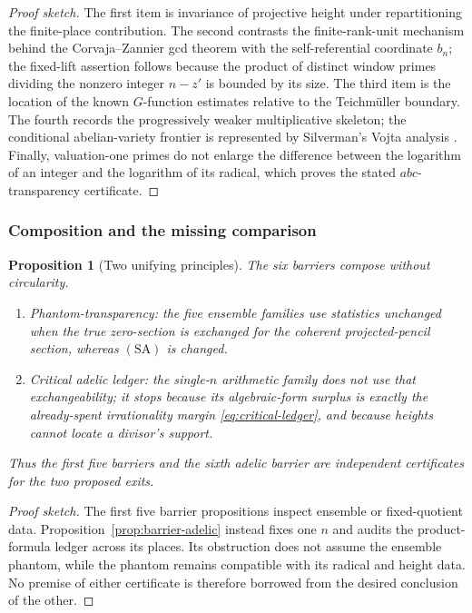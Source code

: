 \documentclass[11pt]{amsart}
\theoremstyle{plain}
\newtheorem{proposition}{Proposition}
\theoremstyle{remark}
\begin{document}
\begin{proof}[Proof sketch]
The first item is invariance of projective height under repartitioning
the finite-place contribution.  The second contrasts the
finite-rank-unit mechanism behind the Corvaja--Zannier gcd theorem
\cite{BugeaudCorvajaZannier2003} with the self-referential coordinate
$b_n$; the fixed-lift assertion follows because the product of distinct
window primes dividing the nonzero integer $n-z'$ is bounded by its
size.  The third item is the location of the known $G$-function
estimates relative to the Teichm\"uller boundary.  The fourth records
the progressively weaker multiplicative skeleton; the conditional
abelian-variety frontier is represented by Silverman's Vojta analysis
\cite{Silverman2005}.  Finally, valuation-one primes do not enlarge the
difference between the logarithm of an integer and the logarithm of
its radical, which proves the stated $abc$-transparency certificate.
\end{proof}

\subsubsection{Composition and the missing comparison}

\begin{proposition}[Two unifying principles]
\label{prop:two-principles}
The six barriers compose without circularity.
\begin{enumerate}
\item \emph{Phantom-transparency:} the five ensemble families use
statistics unchanged when the true zero-section is exchanged for the
coherent projected-pencil section, whereas $(\mathrm{SA})$ is changed.
\item \emph{Critical adelic ledger:} the single-$n$ arithmetic family
does not use that exchangeability; it stops because its
algebraic-form surplus is exactly the already-spent irrationality
margin \eqref{eq:critical-ledger}, and because heights cannot locate a
divisor's support.
\end{enumerate}
Thus the first five barriers and the sixth adelic barrier are
independent certificates for the two proposed exits.
\end{proposition}

\begin{proof}[Proof sketch]
The first five barrier propositions inspect ensemble or fixed-quotient
data.  Proposition~\ref{prop:barrier-adelic} instead fixes one $n$ and
audits the product-formula ledger across its places.  Its obstruction
does not assume the ensemble phantom, while the phantom remains
compatible with its radical and height data.  No premise of either
certificate is therefore borrowed from the desired conclusion of the
other.
\end{proof}
\end{document}
